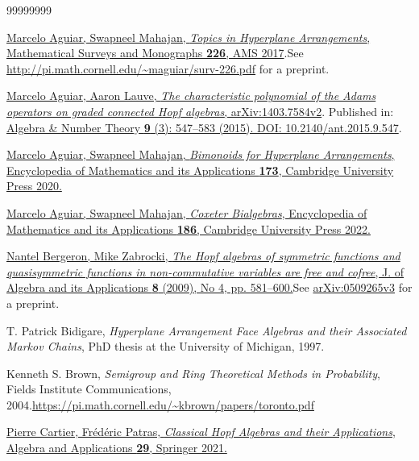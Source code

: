 \documentclass[numbers=enddot,12pt,final,onecolumn,notitlepage]{scrartcl}%
\theoremstyle{definition}
\begin{document}
\begin{thebibliography}{99999999}                                                                                         %


\href{https://bookstore.ams.org/surv-226/}{Marcelo
Aguiar, Swapneel Mahajan, \textit{Topics in Hyperplane Arrangements},
Mathematical Surveys and Monographs \textbf{226}, AMS 2017}.\newline See
\url{http://pi.math.cornell.edu/~maguiar/surv-226.pdf} for a preprint.

\href{https://arxiv.org/abs/1403.7584v2}{Marcelo
Aguiar, Aaron Lauve, \textit{The characteristic polynomial of the Adams
operators on graded connected Hopf algebras}, arXiv:1403.7584v2}. Published
in: \href{https://doi.org/10.2140/ant.2015.9.547}{Algebra \& Number Theory
\textbf{9} (3): 547--583 (2015). DOI: 10.2140/ant.2015.9.547}.

%
\href{https://doi.org/10.1017/9781108863117}{Marcelo Aguiar, Swapneel Mahajan,
\textit{Bimonoids for Hyperplane Arrangements}, Encyclopedia of Mathematics
and its Applications \textbf{173}, Cambridge University Press 2020.}

%
\href{https://doi.org/10.1017/9781009243759}{Marcelo Aguiar, Swapneel Mahajan,
\textit{Coxeter Bialgebras}, Encyclopedia of Mathematics and its Applications
\textbf{186}, Cambridge University Press 2022.}

%
\href{https://doi.org/10.1142/S0219498809003485}{Nantel Bergeron, Mike
Zabrocki, \textit{The Hopf algebras of symmetric functions and quasisymmetric
functions in non-commutative variables are free and cofree}, J. of Algebra and
its Applications \textbf{8} (2009), No 4, pp. 581--600.}\newline See
\href{https://arxiv.org/abs/math/0509265v3}{arXiv:0509265v3} for a preprint.

T. Patrick Bidigare, \textit{Hyperplane
Arrangement Face Algebras and their Associated Markov Chains}, PhD thesis at
the University of Michigan, 1997.

Kenneth S. Brown, \textit{Semigroup and Ring
Theoretical Methods in Probability}, Fields Institute Communications,
2004.\newline\url{https://pi.math.cornell.edu/~kbrown/papers/toronto.pdf}

%
\href{https://doi.org/10.1007/978-3-030-77845-3}{Pierre Cartier,
Fr\'{e}d\'{e}ric Patras, \textit{Classical Hopf Algebras and their
Applications}, Algebra and Applications \textbf{29}, Springer 2021.}


\end{thebibliography}
\end{document}
